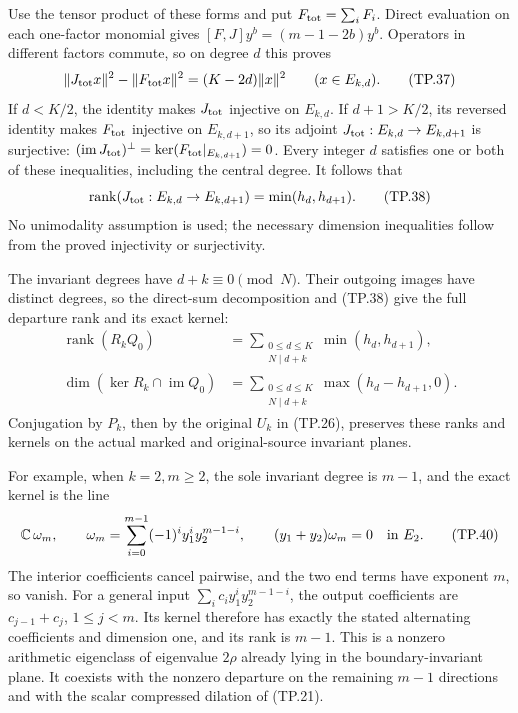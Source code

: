 Use the tensor product of these forms and put
\(F_{\rm tot}=\sum_iF_i\). Direct evaluation on each
one-factor monomial gives \([F,J]y^b=(m-1-2b)y^b\).
Operators in different factors commute, so on degree
\(d\) this proves
\[
 \|J_{\rm tot}x\|^2-\|F_{\rm tot}x\|^2
       =(K-2d)\|x\|^2\qquad(x\in E_{k,d}).
 \tag{TP.37}\label{CFStage:eq:tp-rankidentity}
\]
If \(d<K/2\), the identity makes \(J_{\rm tot}\)
injective on \(E_{k,d}\). If \(d+1>K/2\), its reversed
identity makes \(F_{\rm tot}\) injective on
\(E_{k,d+1}\), so its adjoint
\(J_{\rm tot}:E_{k,d}\to E_{k,d+1}\) is surjective:
\((\operatorname{im}J_{\rm tot})^\perp
  =\ker(F_{\rm tot}|_{E_{k,d+1}})=0\).
Every integer \(d\) satisfies
one or both of these inequalities, including the
central degree. It follows that
\[
 \operatorname{rank}(J_{\rm tot}:E_{k,d}\to E_{k,d+1})
         =\min(h_d,h_{d+1}).
 \tag{TP.38}\label{CFStage:eq:tp-rank}
\]
No unimodality assumption is used; the necessary
dimension inequalities follow from the proved
injectivity or surjectivity.

The invariant degrees have \(d+k\equiv0\pmod N\).
Their outgoing images have distinct degrees, so the
direct-sum decomposition and (TP.38) give the full
departure rank and its exact kernel:
\[
 \begin{split}
 \operatorname{rank}(R_kQ_0)
    &=\sum_{\substack{0\leq d\leq K\\N\mid d+k}}
                      \min(h_d,h_{d+1}),\\
 \dim(\ker R_k\cap\operatorname{im}Q_0)
    &=\sum_{\substack{0\leq d\leq K\\N\mid d+k}}
                      \max(h_d-h_{d+1},0).
 \end{split}
 \tag{TP.39}\label{CFStage:eq:tp-leakagerank}
\]
Conjugation by \(P_k\), then by the original \(U_k\)
in (TP.26), preserves these ranks and kernels on the
actual marked and original-source invariant planes.

For example, when \(k=2,m\geq2\), the sole invariant
degree is \(m-1\), and the exact kernel is the line
\[
 \mathbb C\,\omega_m,\qquad
 \omega_m=\sum_{i=0}^{m-1}(-1)^i y_1^i y_2^{m-1-i},
 \qquad (y_1+y_2)\omega_m=0\quad\hbox{in }E_2.
 \tag{TP.40}\label{CFStage:eq:tp-twofactor}
\]
The interior coefficients cancel pairwise, and the two
end terms have exponent \(m\), so vanish. For a general
input \(\sum_i c_i y_1^i y_2^{m-1-i}\), the output
coefficients are \(c_{j-1}+c_j\), \(1\leq j<m\).
Its kernel therefore has exactly the stated alternating
coefficients and dimension one, and its rank is \(m-1\).
This is a nonzero arithmetic eigenclass of eigenvalue
\(2\rho\) already lying in the boundary-invariant plane.
It coexists with the nonzero departure on the remaining
\(m-1\) directions and with the scalar compressed
dilation of (TP.21).

